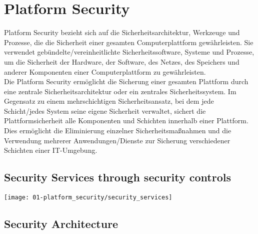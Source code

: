 

\section{Platform Security}
Platform Security bezieht sich auf die Sicherheitsarchitektur, Werkzeuge und Prozesse, die die Sicherheit einer gesamten Computerplattform gewährleisten. Sie verwendet gebündelte/vereinheitlichte Sicherheitssoftware, Systeme und Prozesse, um die Sicherheit der Hardware, der Software, des Netzes, des Speichers und anderer Komponenten einer Computerplattform zu gewährleisten.\\

Die Platform Security ermöglicht die Sicherung einer gesamten Plattform durch eine zentrale Sicherheitsarchitektur oder ein zentrales Sicherheitssystem. Im Gegensatz zu einem mehrschichtigen Sicherheitsansatz, bei dem jede Schicht/jedes System seine eigene Sicherheit verwaltet, sichert die Plattformsicherheit alle Komponenten und Schichten innerhalb einer Plattform. Dies ermöglicht die Eliminierung einzelner Sicherheitsmaßnahmen und die Verwendung mehrerer Anwendungen/Dienste zur Sicherung verschiedener Schichten einer IT-Umgebung.

\subsection{Security Services through security controls}
\begin{center}
    \vspace{-8pt}
    \texttt{[image: 01-platform\_security/security\_services]}
    \vspace{-8pt}
\end{center}

\subsection{Security Architecture}

